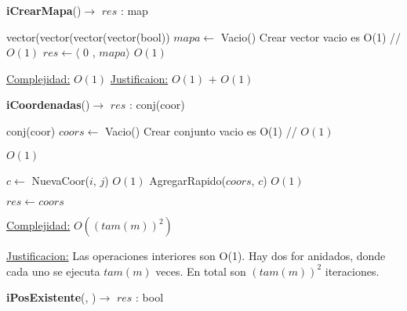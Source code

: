 \begin{Algoritmos}


\begin{algorithm}[H]
{\textbf{iCrearMapa}()$\to$ $res$ : map}
\begin{algorithmic}[1]
   
\State vector(vector(vector(vector(bool)) $mapa \gets$ Vacio()    \Comment Crear vector vacio es O(1) // $O(1)$
\State $res \gets  \langle$ 0 , $mapa \rangle $   \Comment $O(1)$

\medskip
\Statex \underline{Complejidad:} $O(1)$
\State \underline{Justificaion:} $O(1)$ $+$ $O(1)$

\end{algorithmic}
\end{algorithm}

\begin{algorithm}[H]
{\textbf{iCoordenadas}()$\to$ $res$ : conj(coor)}
\begin{algorithmic}[1]
   

\State conj(coor) $coors \gets$ Vacio()      \Comment Crear conjunto vacio es O(1) // $O(1)$

	
		
		  \Comment $O(1)$
			
			\State $c \gets$ NuevaCoor($i$, $j$)   \Comment $O(1)$			
			\State AgregarRapido($coors$, $c$)   \Comment $O(1)$			
			
		\EndIf
		
	\EndFor

\EndFor

\State $res \gets coors$


\medskip
\Statex \underline{Complejidad:} $O((tam(m))^2)$

\Statex \underline{Justificacion:} Las operaciones interiores son O(1). Hay dos for anidados, donde cada uno se ejecuta $tam(m)$ veces. En total son $(tam(m))^2$ iteraciones. 

\end{algorithmic}
\end{algorithm}


\begin{algorithm}[H]
{\textbf{iPosExistente}(, )$\to$ $res$ : bool}
\begin{algorithmic}[1]
   

\end{algorithmic}
\end{algorithm}
\end{Algoritmos}
